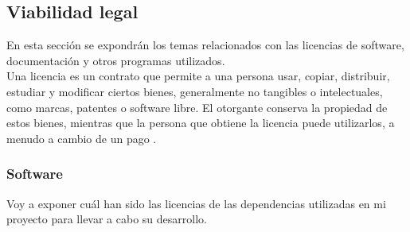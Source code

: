 \subsection{Viabilidad legal}
En esta sección se expondrán los temas relacionados con las licencias de software, documentación y otros programas utilizados. \\
Una licencia es un contrato que permite a una persona usar, copiar, distribuir, estudiar y modificar ciertos bienes, generalmente no tangibles o intelectuales, como marcas, patentes o software libre. El otorgante conserva la propiedad de estos bienes, mientras que la persona que obtiene la licencia puede utilizarlos, a menudo a cambio de un pago \cite{wiki:licencia}. 

\subsubsection{Software}
Voy a exponer cuál han sido las licencias de las dependencias utilizadas en mi proyecto para llevar a cabo su desarrollo.
\renewcommand{\arraystretch}{1.7}

